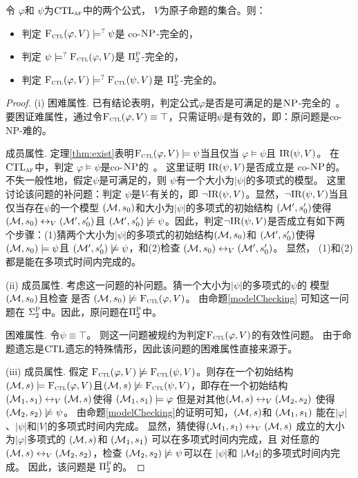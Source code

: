 \begin{theorem}[Entailment]
	\label{thm:comF}
	令 $\varphi$和 $\psi$为$\textrm{CTL}_{\textsc{a} \textsc{f}}$中的两个公式， $V$为原子命题的集合。则：
	\begin{itemize}
		\item[(i)] 判定  ${\textsc{F}_{\textsc{ctl}}}(\varphi, V ) \models^? \psi$是 co-$\textsc{NP}$-完全的，
		\item[(ii)] 判定  $\psi \models^? {\textsc{F}_{\textsc{ctl}}}(\varphi, V)$是 $\Pi_2^{\textsc{P}}$-完全的，
		\item[(iii)] 判定 ${\textsc{F}_{\textsc{ctl}}}(\varphi, V) \models^? {\textsc{F}_{\textsc{ctl}}}(\psi, V)$是 $\Pi_2^{\textsc{P}}$-完全的。
	\end{itemize}
\end{theorem}
\begin{proof}
	(i) 困难属性. 已有结论表明，判定公式$\varphi$是否是可满足的是$\textsc{NP}$-完全的~\cite{meier2009complexity}。要困证难属性，通过令${\textsc{F}_{\textsc{ctl}}}(\varphi, V)\equiv \top$，只需证明$\psi$是有效的，即：原问题是co-NP-难的。
	
	成员属性. 定理\ref{thm:exist}表明${\textsc{F}_{\textsc{ctl}}}(\varphi, V) \models \psi$当且仅当 $\varphi \models \psi$且 $\textrm{IR}(\psi, V)$。
	在$\textrm{CTL}_{\textsc{a} \textsc{f}}$中，判定 $\varphi \models \psi$是co-$\textsc{NP}$的~\cite{meier2009complexity}。
	这里证明 $\textrm{IR}(\psi, V)$是否成立是 co-$\textsc{NP}$的。不失一般性地，假定$\psi$是可满足的，则 $\psi$有一个大小为$|\psi|$的多项式的模型。
	这里讨论该问题的补问题：判定 $\psi$是$V$-有关的，即 $\neg \textrm{IR}(\psi, V)$。显然，$\neg \textrm{IR}(\psi, V)$当且仅当存在$\psi$的一个模型 $({\cal M},s_0)$和大小为$|\psi|$的多项式的初始结构 $({\cal M}',s_0')$使得 $({\cal M},s_0) \leftrightarrow_V ({\cal M}',s_0')$且 $({\cal M}',s_0') \not \models \psi$。因此，判定$\neg \textrm{IR}(\psi, V)$是否成立有如下两个步骤：(1)猜两个大小为$|\psi|$的多项式的初始结构$({\cal M},s_0)$和 $({\cal M}',s_0')$使得 $({\cal M},s_0) \models \psi$且 $({\cal M}',s_0') \not \models \psi$，和(2)检查 $({\cal M},s_0) \leftrightarrow_V ({\cal M}',s_0')$。
	显然， (1)和(2)都是能在多项式时间内完成的。
	
	(ii) 成员属性. 考虑这一问题的补问题。猜一个大小为$|\psi|$的多项式的$\psi$的 模型 $({\cal M},s_0)$且检查 是否 $({\cal M}, s_0) \not \models {\textsc{F}_{\textsc{ctl}}}(\varphi, V)$。
	由命题\ref{modelChecking} 可知这一问题在 $\Sigma_2^{\textsc{P}}$中。因此，原问题在$\Pi_2^{\textsc{P}}$中。
	
	困难属性. 令$\psi \equiv \top$。 则这一问题被规约为判定${\textsc{F}_{\textsc{ctl}}}(\varphi, V)$的有效性问题。 
	由于命题遗忘是$\textrm{CTL}$遗忘的特殊情形，因此该问题的困难属性直接来源于\cite{DBLP:journals/jair/LangLM03}。

(iii) 成员属性. 假定 ${\textsc{F}_{\textsc{ctl}}}(\varphi, V) \not \models {\textsc{F}_{\textsc{ctl}}}(\psi, V)$。则存在一个初始结构 $({\cal M},s) 
\models {\textsc{F}_{\textsc{ctl}}}(\varphi, V)$且$({\cal M},s) \not \models {\textsc{F}_{\textsc{ctl}}}(\psi, V)$，即存在一个初始结构$({\cal M}_1,s_1) \leftrightarrow_V ({\cal M},s)$使得 $({\cal M}_1, s_1) \models \varphi$ 但是对其他$({\cal M}, s) \leftrightarrow_V ({\cal M}_2,s_2)$ 使得 $({\cal M}_2, s_2) \not \models \psi$。
由命题\ref{modelChecking}的证明可知，$({\cal M},s)$和 $({\cal M}_1,s_1)$ 能在$|\varphi|$、$|\psi|$和$|V|$的多项式时间内完成。 
显然，猜使得$({\cal M}_1,s_1) \leftrightarrow_V ({\cal M},s)$ 成立的大小为$|\varphi|$多项式的 $({\cal M},s)$和 $({\cal M}_1,s_1)$ 可以在多项式时间内完成，且 对任意的 $({\cal M}, s) \leftrightarrow_V ({\cal M}_2,s_2)$，检查 $({\cal M}_2,s_2) \not \models \psi$可以在 $|\psi|$和 $|{\cal M}_2|$的多项式时间内完成。
因此，该问题是 $\Pi_2^{\textsc{P}}$的。


\end{proof}
